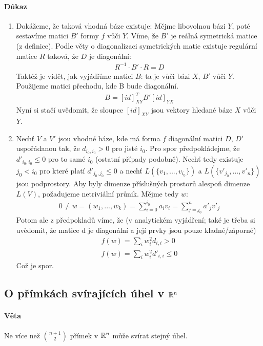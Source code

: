 \documentclass[a4paper,10pt]{article}
\begin{document}
\paragraph{Důkaz}
\begin{enumerate}
	\item Dokážeme, že taková vhodná báze existuje: Mějme libovolnou bázi $Y$,
	poté sestavíme matici $B'$ formy $f$ vůči $Y$. Víme, že $B'$ je reálná
	symetrická matice (z definice). Podle věty o diagonalizaci symetrických
	matic existuje regulární matice $R$ taková, že $D$ je diagonální:
	\begin{align}
		R^{-1} \cdot B' \cdot R = D
	\end{align}
	Taktéž je vidět, jak vyjádříme matici $B$: ta je vůči bázi $X$, $B'$ vůči
	$Y$. Použijeme matici přechodu, kde B bude diagonální.
	\begin{align}
		B = [id]_{XY}^T B' [id]_{YX}
	\end{align}
	Nyní si stačí uvědomit, že sloupce $[id]_{XY}$ jsou vektory hledané báze $X$
	vůči $Y$.
	\item
	Nechť $V$ a $V'$ jsou vhodné báze, kde má forma $f$ diagonální matici $D$,
	$D'$ uspořádanou tak, že $d_{i_0,i_0} \gt 0$ pro jisté $i_0$. Pro spor
	předpokládejme, že $d'_{i_0,i_0} \le 0$ pro to samé $i_0$ (ostatní případy
	podobně). Nechť tedy existuje $j_0 < i_0$ pro které platí $d'_{j_0,j_0} \le
	0$ a
	nechť $L(\{v_1, ..., v_{i_0}\})$ a $L(\{v'_{j_0}, ..., v'_n\})$ jsou podprostory.
	Aby byly dimenze příslušných prostorů alespoň dimenze $L(V)$, požadujeme
	netriviální průnik. Mějme tedy $w$:
	\begin{align}
		0 \neq w = (w_1, ..., w_k) = \sum_{i=0}^{i_0} a_i v_i = \sum_{j=j_0}^n a'_j v'_j
	\end{align}
	Potom ale z předpokladů víme, že (v analytickém vyjádření; také je třeba si
	uvědomit, že matice d je diagonální a její prvky jsou pouze kladné/záporné)
	\begin{align}
		f(w) = \sum_i w_i^2 d_{i,i} \gt 0\\
		f(w) = \sum_i w_i^2 d'_{i,i} \le 0
	\end{align}
	Což je spor.
\end{enumerate}


\subsection{O přímkách svírajících úhel v $\mathbb{R}^n$}
\setcounter{equation}{0}
\paragraph{Věta}
Ne více než $\binom{n+1}{2}$ přímek v $\mathbb{R}^n$ může svírat stejný úhel.
\end{document}

